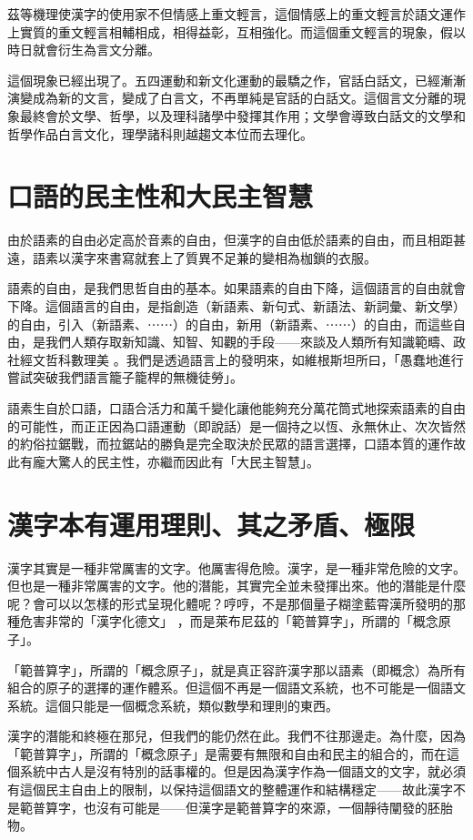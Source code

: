 \documentclass[a5paper, 12pt, openany]{book} %
\begin{document}
茲等機理使漢字的使用家不但情感上重文輕言，這個情感上的重文輕言於語文運作上實質的重文輕言相輔相成，相得益彰，互相強化。而這個重文輕言的現象，假以時日就會衍生為言文分離。

這個現象已經出現了。五四運動和新文化運動的最驕之作，官話白話文，已經漸漸演變成為新的文言，變成了白言文，不再單純是官話的白話文。這個言文分離的現象最終會於文學、哲學，以及理科諸學中發揮其作用；文學會導致白話文的文學和哲學作品白言文化，理學諸科則越趨文本位而去理化。

\section{口語的民主性和大民主智慧}

由於語素的自由必定高於音素的自由，但漢字的自由低於語素的自由，而且相距甚遠，語素以漢字來書寫就套上了質異不足兼的變相為枷鎖的衣服。

語素的自由，是我們思哲自由的基本。如果語素的自由下降，這個語言的自由就會下降。這個語言的自由，是指創造（新語素、新句式、新語法、新詞彙、新文學）的自由，引入（新語素、⋯⋯）的自由，新用（新語素、⋯⋯）的自由，而這些自由，是我們人類存取新知識、知智、知觀的手段——來談及人類所有知識範疇、政社經文哲科數理美 。我們是透過語言上的發明來，如維根斯坦所曰，「愚蠢地進行嘗試突破我們語言籠子籠桿的無機徒勞」。

語素生自於口語，口語合活力和萬千變化讓他能夠充分萬花筒式地探索語素的自由的可能性，而正正因為口語運動（即說話）是一個持之以恆、永無休止、次次皆然的約俗拉鋸戰，而拉鋸站的勝負是完全取決於民眾的語言選擇，口語本質的運作故此有龐大驚人的民主性，亦繼而因此有「大民主智慧」。

\section{漢字本有運用理則、其之矛盾、極限}

漢字其實是一種非常厲害的文字。他厲害得危險。漢字，是一種非常危險的文字。但也是一種非常厲害的文字。他的潛能，其實完全並未發揮出來。他的潛能是什麼呢？會可以以怎樣的形式呈現化體呢？哼哼，不是那個量子糊塗藍霄漢所發明的那種危害非常的「漢字化德文」 ，而是萊布尼茲的「範普算字」，所謂的「概念原子」。

「範普算字」，所謂的「概念原子」，就是真正容許漢字那以語素（即概念）為所有組合的原子的選擇的運作體系。但這個不再是一個語文系統，也不可能是一個語文系統。這個只能是一個概念系統，類似數學和理則的東西。

漢字的潛能和終極在那兒，但我們的能仍然在此。我們不往那邊走。為什麼，因為「範普算字」，所謂的「概念原子」是需要有無限和自由和民主的組合的，而在這個系統中古人是沒有特別的話事權的。但是因為漢字作為一個語文的文字，就必須有這個民主自由上的限制，以保持這個語文的整體運作和結構穩定——故此漢字不是範普算字，也沒有可能是——但漢字是範普算字的來源，一個靜待闡發的胚胎物。
\end{document}

